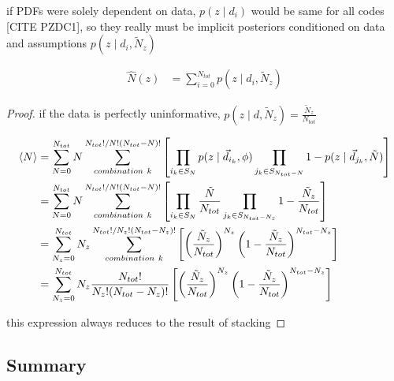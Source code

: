 \begin{theorem}
if PDFs were solely dependent on data, $p(z \mid d_{i})$ would be same for all codes [CITE PZDC1], so they really must be implicit posteriors conditioned on data and assumptions $p(z \mid d_{i}, \tilde{N}_{z})$

\begin{align}
\label{eq:stackwithprior}
\hat{N}(z) &= \sum_{i = 0}^{N_{tot}} p(z \mid d_{i}, \tilde{N}_{z})
\end{align}
\end{theorem}
\begin{proof}
if the data is perfectly uninformative, $p(z \mid d, \tilde{N}_{z}) = \frac{\tilde{N}_{z}}{N_{tot}}$

\begin{align}
\label{eq:prior}
\langle N \rangle &= \sum_{N = 0}^{N_{tot}} N \sum_{combination\ k}^{N_{tot}! / N! (N_{tot} - N)!} \left[ \prod_{i_{k} \in S_{N}} p(z \gvn \data_{i_{k}}, \phi) \prod_{j_{k} \in S_{N_{tot} - N}} 1 - p(z \gvn \data_{j_{k}}, \tilde{N}) \right]\\
&= \sum_{N = 0}^{N_{tot}} N \sum_{combination\ k}^{N_{tot}! / N! (N_{tot} - N)!} \left[ \prod_{i_{k} \in S_{N}} \frac{\tilde{N}}{N_{tot}} \prod_{j_{k} \in S_{N_{tot} - N_{z}}} 1 - \frac{\tilde{N}_{z}}{N_{tot}} \right]\\
&= \sum_{N_{z} = 0}^{N_{tot}} N_{z} \sum_{combination\ k}^{N_{tot}! / N_{z}! (N_{tot} - N_{z})!} \left[ \left(\frac{\tilde{N}_{z}}{N_{tot}}\right)^{N_{z}} \left(1 - \frac{\tilde{N}_{z}}{N_{tot}}\right)^{N_{tot}-N_{z}} \right]\\
&= \sum_{N_{z} = 0}^{N_{tot}} N_{z} \frac{N_{tot}!}{N_{z}! (N_{tot} - N_{z})!} \left[ \left(\frac{\tilde{N}_{z}}{N_{tot}}\right)^{N_{z}} \left(1 - \frac{\tilde{N}_{z}}{N_{tot}}\right)^{N_{tot}-N_{z}} \right]\\
\end{align}

this expression always reduces to the result of stacking
\end{proof}


\subsection{Summary}

